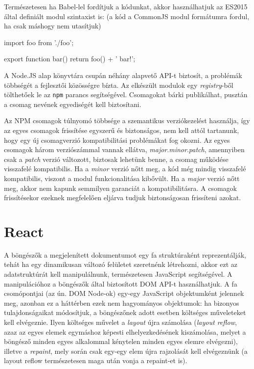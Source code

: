 Természetesen ha Babel-lel fordítjuk a kódunkat, akkor használhatjuk az ES2015
által definiált modul szintaxist is: (a kód a CommonJS modul formátumra fordul,
ha csak máshogy nem utasítjuk)

\begin{js}
import foo from './foo';

export function bar() {
  return foo() + ' bar!';
}
\end{js}

A Node.JS alap könyvtára csupán néhány alapvető API-t biztosít, a problémák
többségét a fejlesztői közösségre bízta.  Az elkészült modulok egy
\emph{registry}-ből tölthetőek le az \texttt{npm} parancs segítségével.
Csomagokat bárki publikálhat, pusztán a csomag nevének egyediségét kell
biztosítani.

Az NPM csomagok túlnyomó többsége a szemantikus verziókezelést
használja\cite{semver}, így az egyes csomagok frissítése egyszerű és
biztonságos, nem kell attól tartanunk, hogy egy új csomagverzió kompatibilitási
problémákat fog okozni.  Az egyes csomagok három verziószámmal vannak ellátva,
\emph{major}.\emph{minor}.\emph{patch}, amennyiben csak a \emph{patch} verzió
változott, biztosak lehetünk benne, a csomag működése visszafelé kompatibilis.
Ha a \emph{minor} verzió nőtt meg, a kód még mindig visszafelé kompatibilis,
viszont a modul funkcionalitása kibővült.  Ha a \emph{major} verzió nőtt meg,
akkor nem kapunk semmilyen garanciát a kompatibilitásra.  A csomagok
frissítésekor ezeknek megfelelően eljárva tudjuk biztonságosan frissíteni
azokat.

\section{React}\label{sec:react}

A böngészők a megjelenített dokumentumot egy fa struktúraként reprezentálják,
tehát ha egy dinamikusan változó felületet szeretnénk létrehozni, akkor ezt az
adatstruktúrát kell manipulálnunk, természetesen JavaScript segítségével. A
manipulációhoz a böngészők által biztosított DOM API-t használhatjuk\cite{dom}.
A fa csomópontjai (az ún. DOM Node-ok) egy-egy JavaScript objektumként jelennek
meg, azonban ez a háttérben ezek nem hagyományos objektumok: ha bizonyos
tulajdonságaikat módosítjuk, a böngészőnek adott esetben költséges műveleteket
kell elvégeznie. Ilyen költséges művelet a \emph{layout} újra számolása
(\emph{layout reflow}, azaz az egyes elemek egymáshoz képesti elhelyezkedésének
kiszámolása, melyet a böngésző minden egyes alkalommal kénytelen minden egyes
elemre elvégezni), illetve a \emph{repaint}, mely során csak egy-egy elem
újra rajzolását kell elvégeznünk (a layout reflow természetesen maga után vonja a
repaint-et is).


